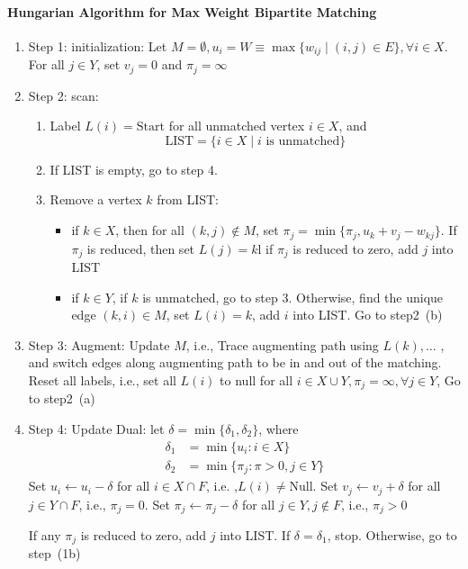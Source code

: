 \paragraph{Hungarian Algorithm for Max Weight Bipartite Matching}
\begin{enumerate}
\item
Step 1: initialization:
Let $M=\emptyset, u_i=W\equiv\max\{w_{ij}\mid (i,j)\in E\},\forall i\in X$.
For all $j\in Y$, set $v_j=0$ and $\pi_j=\infty$
\item
Step 2: scan:
\begin{enumerate}
\item
Label $L(i)=\text{Start}$ for all unmatched vertex $i\in X$, and
\[
\text{LIST}=\{i\in X\mid\text{$i$ is unmatched}\}
\]
\item
If LIST is empty, go to step 4.
\item
Remove a vertex $k$ from LIST:
\begin{itemize}
\item
if $k\in X$, then for all $(k,j)\notin M$, set $\pi_j=\min\{\pi_j,u_k+v_j-w_{kj}\}$.
If $\pi_j$ is reduced, then set $L(j)=k$l
if $\pi_j$ is reduced to zero, add $j$ into LIST
\item
if $k\in Y$, if $k$ is unmatched, go to step 3. Otherwise, find the unique edge $(k,i)\in M$, set $L(i)=k$, add $i$ into LIST. Go to step2~(b)
\end{itemize}
\end{enumerate}
\item
Step 3: Augment:
Update $M$, i.e., Trace augmenting path using $L(k),\dots$ , and switch edges along augmenting path to be in and out of the matching.
Reset all labels, i.e., set all $L(i)$ to null for all $i\in X\cup Y,\pi_j=\infty,\forall j\in Y$, Go to step2~(a)
\item
Step 4: Update Dual:
let $\delta=\min\{\delta_1,\delta_2\}$, where
\begin{align*}
\delta_1&=\min\{u_i:i\in X\}\\
\delta_2&=\min\{\pi_j: \pi>0,j\in Y\}
\end{align*}
Set $u_i\leftarrow u_i-\delta$ for all $i\in X\cap F$, i.e. ,$L(i)\ne\text{Null}$.
Set $v_j\leftarrow v_j+\delta$ for all $j\in Y\cap F$, i.e., $\pi_j=0$.
Set $\pi_j\leftarrow \pi_j-\delta$ for all $j\in Y,j\notin F$, i.e., $\pi_j>0$

If any $\pi_j$ is reduced to zero, add $j$ into LIST.
If $\delta=\delta_1$, stop. Otherwise, go to step~(1b)
\end{enumerate}





